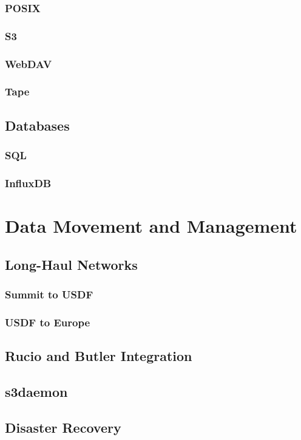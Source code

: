 	    \subsubsection{POSIX}
	    \subsubsection{S3}
	    \subsubsection{WebDAV}
	    \subsubsection{Tape}
	\subsection{Databases}
	    \subsubsection{SQL}
	    \subsubsection{InfluxDB}
\section{Data Movement and Management}
        \subsection{Long-Haul Networks}
	    \subsubsection{Summit to USDF}
	    \subsubsection{USDF to Europe}
        \subsection{Rucio and Butler Integration}
	\subsection{s3daemon}
	\subsection{Disaster Recovery}
